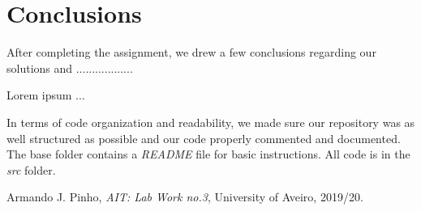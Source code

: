 \documentclass[12pt]{article}
\begin{document}

\section*{Conclusions}

After completing the assignment, we drew a few conclusions regarding our 
solutions and ..................

Lorem ipsum ...

In terms of code organization and readability, we made sure our 
repository was as well structured as possible and our code properly commented
and documented.
The base folder contains a {\it README\/} file for basic instructions.
All code is in the {\it src\/} folder.

\newpage
\begin{thebibliography}{9}
  

    Armando J. Pinho,
    \textit{AIT: Lab Work no.3},
    University of Aveiro,
    2019/20.
  
\end{thebibliography}

\clearpage
\end{document}
